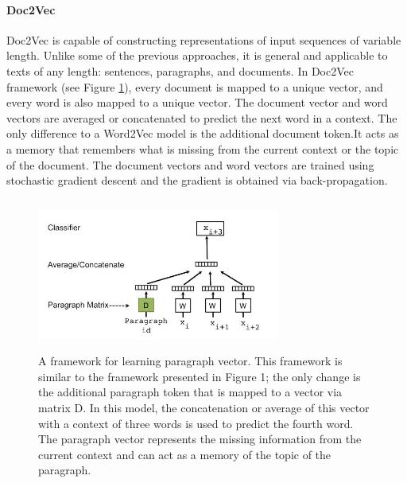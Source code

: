 \paragraph{Doc2Vec}Doc2Vec is capable of constructing representations of input sequences of
variable length. Unlike some of the previous approaches, it is general and
applicable to texts of any length: sentences, paragraphs, and documents. In
Doc2Vec framework (see Figure \ref{fig:doc2vec model}), every document is mapped to a unique
vector, and every word is also mapped to a unique vector. The document
vector and word vectors are averaged or concatenated to predict the next
word in a context. The only difference to a Word2Vec model is the additional
document token.It acts as a memory that remembers what is missing from
the current context or the topic of the document. The document vectors and
word vectors are trained using stochastic gradient descent and the gradient
is obtained via back-propagation.

	\begin{figure}[h]
		\centering
		\includegraphics[width=8cm, height=5cm]{para}
		\caption[]{A framework for learning paragraph vector. This framework
			is similar to the framework presented in Figure 1; the only
			change is the additional paragraph token that is mapped to a vector
			via matrix D. In this model, the concatenation or average of
			this vector with a context of three words is used to predict the
			fourth word. The paragraph vector represents the missing information
			from the current context and can act as a memory of the
			topic of the paragraph.}
		\label{fig:doc2vec model}
	\end{figure}
	